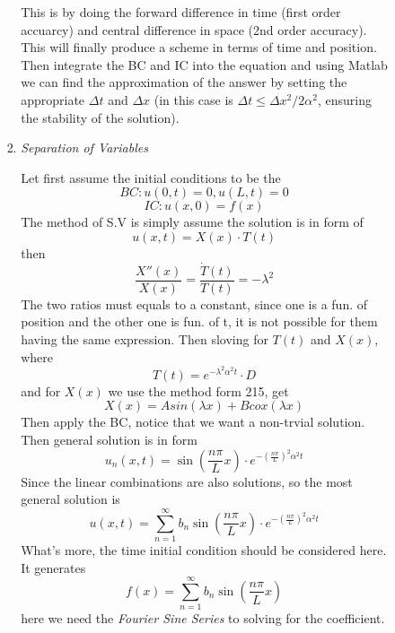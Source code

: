 \documentclass[10pt]{article}
\newenvironment{changemargin}[2]{%
  \begin{list}{}{%
    \setlength{\topsep}{0pt}%
    \setlength{\leftmargin}{#1}%
    \setlength{\rightmargin}{#2}%
    \setlength{\listparindent}{\parindent}%
    \setlength{\itemindent}{\parindent}%
    \setlength{\parsep}{\parskip}%
  }%
  \item[]}{\end{list}}
\begin{document}
\begin{changemargin}{-0.125in}{0in}
\begin{enumerate}
\begin{enumerate}
\begin{enumerate}
\begin{enumerate}
  	                 	\smallskip
  	                 	
  	                 	This is by doing the forward difference in time (first order accuarcy) and central difference in space (2nd order accuracy). This will finally produce a scheme in terms of time and position. Then integrate the BC and IC into the equation and using Matlab we can find the approximation of the answer by setting the appropriate $\Delta t$ and $\Delta x$ (in this case is $\Delta t \leq \Delta x^2/ 2\alpha^2$, ensuring the stability of the solution).
  	                 	
  	                     \medskip
  	                     
  	                     \item \textit{Separation of Variables}
  	                     
  	                     \smallskip
  	                     
  	                     Let first assume the initial conditions to be the 
  	                     \[
  	                     BC: u(0,t) = 0, u(L,t) = 0
  	                     \]
  	                     \[
  	                     IC: u(x,0) = f(x)
  	                     \]
  	                     The method of S.V is simply assume the solution is in form of 
  	                     \[
  	                     u(x,t) = X(x) \cdot T(t)
  	                     \]
  	                     then 
  	                     \[
  	                      \frac{X''(x)}{X(x)} = \frac{\dot{T}(t)}{T(t)} = -\lambda^2
  	                     \]
  	                     The two ratios must equals to a constant, since one is a fun. of position and the other one is fun. of t, it is not possible for them having the same expression. Then sloving for $T(t)$ and $X(x)$, where 
  	                     \[
  	                     T(t) = e^{-\lambda^2\alpha^2 t} \cdot D
  	                     \]
  	                     and for $X(x)$ we use the method form 215, get 
  	                     \[
  	                     X(x) = A sin(\lambda x) + B cox(\lambda x)
  	                     \]
  	                     Then apply the BC, notice that we want a non-trvial solution. Then general solution is in form 
  	                     \[
  	                     u_n(x,t) = \sin(\frac{n\pi}{L} x) \cdot e^{-(\frac{n\pi}{L})^2\alpha^2 t} 
  	                     \]
  	                     Since the linear combinations are also solutions, so the most general solution is 
  	                     \[
  	                     u(x,t) = \sum^{\infty}_{n = 1} b_n\sin(\frac{n\pi}{L} x) \cdot e^{-(\frac{n\pi}{L})^2\alpha^2 t}
  	                     \]
  	                     What's more, the time initial condition should be considered here. It generates 
  	                     \[
  	                     f(x) = \sum^{\infty}_{n = 1}b_n \sin(\frac{n\pi}{L} x)
  	                     \]
  	                     here we need the \textit{Fourier Sine Series} to solving for the coefficient. 
  	                 \end{enumerate}
  	                 

\end{enumerate}
\end{enumerate}
\end{enumerate}
\end{changemargin}
\end{document}
